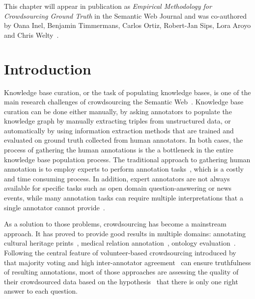 
This chapter will appear in publication as \textit{Empirical Methodology for Crowdsourcing Ground Truth} in the Semantic Web Journal and was co-authored by Oana Inel, Benjamin Timmermans, Carlos Ortiz, Robert-Jan Sips, Lora Aroyo and Chris Welty~\cite{dumitracheempirical}.

\section{Introduction}
\label{sec:introduction}

Knowledge base curation, or the task of populating knowledge bases, is one of the main research challenges of crowdsourcing the Semantic Web~\cite{sarasua2015crowdsourcing}. Knowledge base curation can be done either manually, by asking annotators to populate the knowledge graph by manually extracting triples from unstructured data, or automatically by using information extraction methods that are trained and evaluated on ground truth collected from human annotators. In both cases, the process of gathering the human annotations is the a bottleneck in the entire knowledge base population process. The traditional approach to gathering human annotation is to employ experts to perform annotation tasks~\cite{welty2012query}, which is a costly and time consuming process. In addition, expert annotators are not always available for specific tasks such as open domain question-answering or news events, while many annotation tasks can require multiple interpretations that a single annotator cannot provide~\cite{aroyo2012harnessing}.

As a solution to those problems, crowdsourcing has become a mainstream approach. It has proved to provide good results in multiple domains: annotating cultural heritage prints~\cite{oosterman2014crowdsourcing}, medical relation annotation~\cite{aroyo2013measuring}, ontology evaluation~\cite{noy2013mechanical}. Following the central feature of volunteer-based crowdsourcing introduced by~\cite{von2009human} that majority voting and high inter-annotator agreement~\cite{Carletta1996} can ensure truthfulness of resulting annotations, most of those approaches are assessing the quality of their crowdsourced data based on the hypothesis~\cite{nowak2010reliable} that there is only one right answer to each question.

